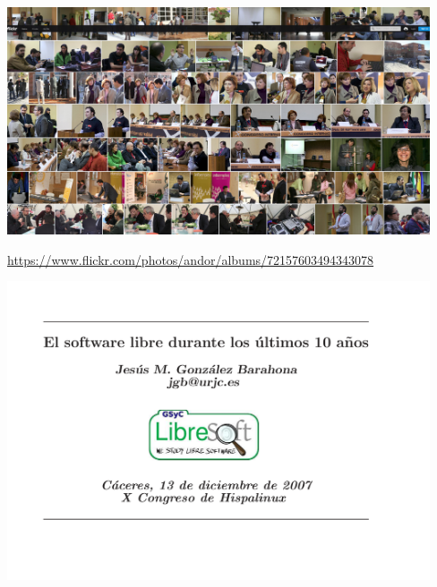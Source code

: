 \documentclass[17pt,aspectratio=169]{beamer}
\begin{document}
\begin{frame}

\begin{center}
  \includegraphics[width=12.5cm]{figs/hispalinux-x-fotos}
\end{center}  

\begin{flushright}
  {\scriptsize{\url{https://www.flickr.com/photos/andor/albums/72157603494343078}}}
\end{flushright}
\end{frame}

\begin{frame}

\begin{center}
  \includegraphics[width=12.5cm]{figs/transpas-01}
\end{center}

\end{frame}
\end{document}
